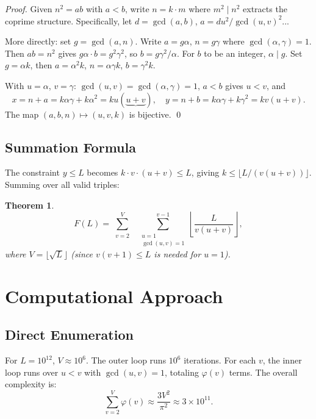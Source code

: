 \documentclass[11pt]{article}
\newtheorem{theorem}{Theorem}
\begin{document}
\begin{proof}
Given $n^2 = ab$ with $a < b$, write $n = k \cdot m$ where $m^2 \mid n^2$ extracts
the coprime structure. Specifically, let $d = \gcd(a, b)$, $a = d u^2 / \gcd(u,v)^2$...

More directly: set $g = \gcd(a, n)$. Write $a = g \alpha$, $n = g \gamma$ where $\gcd(\alpha, \gamma) = 1$. Then $ab = n^2$ gives $g \alpha \cdot b = g^2 \gamma^2$, so $b = g \gamma^2 / \alpha$. For $b$ to be an integer, $\alpha \mid g$. Set $g = \alpha k$, then $a = \alpha^2 k$, $n = \alpha \gamma k$, $b = \gamma^2 k$.

With $u = \alpha$, $v = \gamma$: $\gcd(u, v) = \gcd(\alpha, \gamma) = 1$, $a < b$ gives $u < v$, and
\[
x = n + a = k\alpha\gamma + k\alpha^2 = ku(\underbrace{u+v}), \quad
y = n + b = k\alpha\gamma + k\gamma^2 = kv(u+v).
\]
The map $(a, b, n) \mapsto (u, v, k)$ is bijective. \qed
\end{proof}

\subsection{Summation Formula}

The constraint $y \leq L$ becomes $k \cdot v \cdot (u+v) \leq L$, giving
$k \leq \lfloor L / (v(u+v)) \rfloor$. Summing over all valid triples:

\begin{theorem}
\[
F(L) = \sum_{\substack{v=2}}^{V} \;\; \sum_{\substack{u=1 \\ \gcd(u,v)=1}}^{v-1} \left\lfloor \frac{L}{v(u+v)} \right\rfloor,
\]
where $V = \lfloor\sqrt{L}\rfloor$ (since $v(v+1) \leq L$ is needed for $u=1$).
\end{theorem}

\section{Computational Approach}

\subsection{Direct Enumeration}

For $L = 10^{12}$, $V \approx 10^6$. The outer loop runs $10^6$ iterations.
For each $v$, the inner loop runs over $u < v$ with $\gcd(u,v) = 1$, totaling
$\varphi(v)$ terms. The overall complexity is:
\[
\sum_{v=2}^{V} \varphi(v) \approx \frac{3V^2}{\pi^2} \approx 3 \times 10^{11}.
\]
\end{document}
